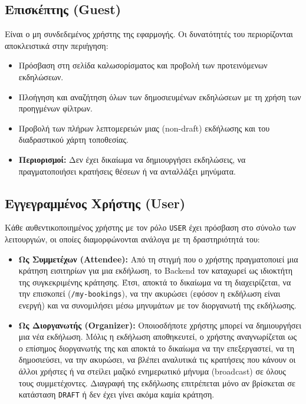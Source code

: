 \documentclass[12pt]{fphw}
\newcommand{\en}[1]{\foreignlanguage{english}{#1}}
\begin{document}
\subsection{Επισκέπτης (\en{Guest})}
Είναι ο μη συνδεδεμένος χρήστης της εφαρμογής. Οι δυνατότητές του περιορίζονται αποκλειστικά στην περιήγηση:
\begin{itemize}[leftmargin=*]
    \item Πρόσβαση στη σελίδα καλωσορίσματος και προβολή των προτεινόμενων εκδηλώσεων.
    \item Πλοήγηση και αναζήτηση όλων των δημοσιευμένων εκδηλώσεων με τη χρήση των προηγμένων φίλτρων.
    \item Προβολή των πλήρων λεπτομερειών μιας (\en{non-draft}) εκδήλωσης και του διαδραστικού χάρτη τοποθεσίας.
    \item \textbf{Περιορισμοί:} Δεν έχει δικαίωμα να δημιουργήσει εκδηλώσεις, να πραγματοποιήσει κρατήσεις θέσεων ή να ανταλλάξει μηνύματα.
\end{itemize}

\subsection{Εγγεγραμμένος Χρήστης (\en{User})}
Κάθε αυθεντικοποιημένος χρήστης με τον ρόλο \en{\texttt{USER}} έχει πρόσβαση στο σύνολο των λειτουργιών, οι οποίες διαμορφώνονται ανάλογα με τη δραστηριότητά του:
\begin{itemize}[leftmargin=*]
    \item \textbf{Ως Συμμετέχων (\en{Attendee}):} Από τη στιγμή που ο χρήστης πραγματοποιεί μια κράτηση εισιτηρίων για μια εκδήλωση, το \en{Backend} τον καταχωρεί ως ιδιοκτήτη της συγκεκριμένης κράτησης. Έτσι, αποκτά το δικαίωμα να τη διαχειρίζεται, να την επισκοπεί (\en{\texttt{/my-bookings}}), να την ακυρώσει (εφόσον η εκδήλωση είναι ενεργή) και να συνομιλήσει μέσω μηνυμάτων με τον διοργανωτή της εκδήλωσης.
    \item \textbf{Ως Διοργανωτής (\en{Organizer}):} Οποιοσδήποτε χρήστης μπορεί να δημιουργήσει μια νέα εκδήλωση. Μόλις η εκδήλωση αποθηκευτεί, ο χρήστης αναγνωρίζεται ως ο επίσημος διοργανωτής της και αποκτά το δικαίωμα να την επεξεργαστεί, να τη δημοσιεύσει, να την ακυρώσει, να βλέπει αναλυτικά τις κρατήσεις που κάνουν οι άλλοι χρήστες ή να στείλει μαζικό ενημερωτικό μήνυμα (\en{broadcast}) σε όλους τους συμμετέχοντες. Διαγραφή της εκδήλωσης επιτρέπεται μόνο αν βρίσκεται σε κατάσταση \en{\texttt{DRAFT}} ή δεν έχει γίνει ακόμα καμία κράτηση.
\end{itemize}
\end{document}
